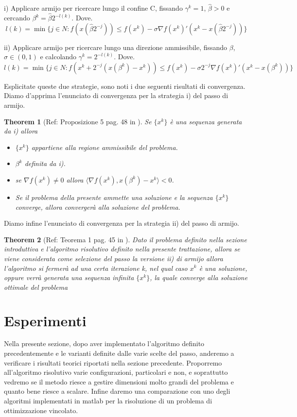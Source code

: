 \documentclass[12pt]{extarticle}
\newtheorem{theorem}{Theorem}[section]
\begin{document}
i) Applicare armijo per ricercare lungo il confine C, fissando $\gamma^k = 1$, ${\hat{\beta} > 0}$ e cercando $\beta^k =\hat{\beta}2^{-l(k)}$. Dove. 
\[l(k) = \min \{j \in N : f(x(\hat{\beta}2^{-j})) \leq f(x^k) - \sigma \nabla f(x^k)'(x^k - x(\hat{\beta}2^{-j})) \}\]

ii) Applicare armijo per ricercare lungo una direzione ammissibile, fissando $\beta$, $\sigma \in (0,1)$ e calcolando $\gamma^k = 2^{-l(k)}$. Dove.
\[l(k) = \min \{j \in N : f(x^k + 2^{-j}(x(\beta^k) - x^k)) \leq f(x^k) - \sigma 2^{-j} \nabla f(x^k)'(x^k - x(\beta^k)) \}\]

Esplicitate queste due strategie, sono noti i due seguenti risultati di convergenza.\\
Diamo d'apprima l'enunciato di convergenza per la strategia i) del passo di armijo.
\begin{theorem}[Ref: Proposizione 5 pag. 48 in \cite{gafni1982convergence}]
Se $\{x^k\}$ è una sequenza generata da i) allora\\
\begin{itemize}
    \item $\{x^k\}$ appartiene alla regione ammissibile del problema.
    \item $\beta^k$ definita da i).
    \item se $\nabla f(x^k) \neq 0$ allora $\langle \nabla f(x^k), x(\beta^k) - x^k \rangle < 0$.
    \item Se il problema della presente ammette una soluzione e la sequenza $\{x^k\}$ converge, allora convergerà alla soluzione del problema.
\end{itemize}
\end{theorem}
Diamo infine l'enunciato di convergenza per la strategia ii) del passo di armijo.
\begin{theorem}[Ref: Teorema 1 pag. 45 in \cite{gafni1982convergence}]
Dato il problema definito nella sezione introduttiva e l'algoritmo risolutivo definito nella presente trattazione, allora se viene considerata come selezione del passo la versione ii) di armijo allora l'algoritmo si fermerà ad una certa iterazione k, nel qual caso $x^k$ è una soluzione, oppure verrà generata una sequenza infinita $\{x^k\}$, la quale converge alla soluzione ottimale del problema
\end{theorem}
\section{Esperimenti}
Nella presente sezione, dopo aver implementato l'algoritmo definito precedentemente e le varianti definite dalle varie scelte del passo, anderemo a verificare i risultati teorici riportati nella sezione precedente. Proporremo all'algoritmo risolutivo varie configurazioni, particolari e non, e soprattutto vedremo se il metodo riesce a gestire dimensioni molto grandi del problema e quanto bene riesce a scalare. Infine daremo una comparazione con uno degli algoritmi implementati in matlab per la risoluzione di un problema di ottimizzazione vincolato.
\end{document}
